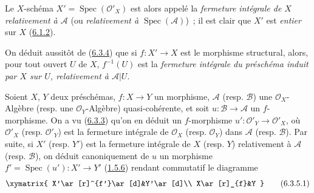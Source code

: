 Le $X$-schéma $X'=\operatorname{Spec}(\mathcal{O}'_X)$ est alors appelé la
\emph{fermeture intégrale de $X$ relativement à $\mathcal{A}$} (ou
\emph{relativement à $\operatorname{Spec}(\mathcal{A})$})~; il est clair que
$X'$ est \emph{entier} sur $X$ (\hyperref[II.6.1.2-fr]{6.1.2}).

On déduit aussitôt de (\hyperref[II.6.3.4-fr]{6.3.4}) que si $f:X'\to X$ est
le morphisme structural, alors, pour tout ouvert $U$ de $X$, $f^{-1}(U)$ est
la \emph{fermeture intégrale du préschéma induit par $X$ sur $U$, relativement
à $\mathcal{A}|U$}.

\begin{env}[6.3.5]
\label{II.6.3.5-fr}
Soient $X$, $Y$ deux préschémas, $f:X\to Y$ un morphisme, $\mathcal{A}$
(resp. $\mathcal{B}$) une $\mathcal{O}_X$-Algèbre (resp. une
$\mathcal{O}_Y$-Algèbre) quasi-cohérente, et soit
$u:\mathcal{B}\to\mathcal{A}$ un $f$-morphisme. On a vu
(\hyperref[II.6.3.3-fr]{6.3.3}) qu'on en déduit un $f$-morphisme
$u':\mathcal{O}'_Y\to\mathcal{O}'_X$, où $\mathcal{O}'_X$ (resp.
$\mathcal{O}'_Y$) est la fermeture intégrale de $\mathcal{O}_X$ (resp.
$\mathcal{O}_Y$) dans $\mathcal{A}$ (resp. $\mathcal{B}$). Par suite, si
$X'$ (resp. $Y'$) est la fermeture intégrale de $X$ (resp. $Y$) relativement
à $\mathcal{A}$ (resp. $\mathcal{B}$), on déduit canoniquement de $u$ un
morphisme $f'=\operatorname{Spec}(u'):X'\to Y'$
(\hyperref[II.1.5.6-fr]{1.5.6}) rendant commutatif le diagramme
\[
\label{II.6.3.5.1-fr}
\xymatrix{
X'\ar[r]^{f'}\ar[d]&Y'\ar[d]\\
X\ar[r]_{f}&Y
}
\tag{6.3.5.1}
\]
\end{env}

